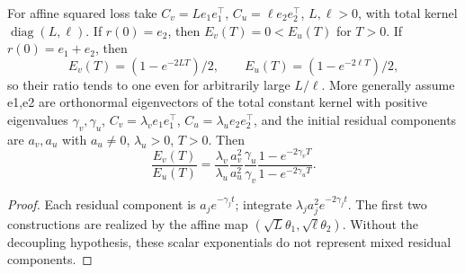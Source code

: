 \begin{proposition}
\label{prop:astra_energy_counter}
For affine squared loss take
$C_v=L e_1e_1^\top$, $C_u=\ell e_2e_2^\top$, $L,\ell>0$, with
total kernel $\operatorname{diag}(L,\ell)$.
If $r(0)=e_2$, then $E_v(T)=0<E_u(T)$ for $T>0$.
If $r(0)=e_1+e_2$, then
\[
 E_v(T)=(1-e^{-2LT})/2,\qquad E_u(T)=(1-e^{-2\ell T})/2,
\]
so their ratio tends to one even for arbitrarily large $L/\ell$.
More generally assume e1,e2 are orthonormal eigenvectors of the total
constant kernel with positive eigenvalues $\gamma_v,\gamma_u$,
$C_v=\lambda_v e_1e_1^\top$, $C_u=\lambda_u e_2e_2^\top$, and the
initial residual components are $a_v,a_u$ with $a_u\ne0$,
$\lambda_u>0$, $T>0$. Then
\begin{equation}\label{eq:astra_decoupled}
 \frac{E_v(T)}{E_u(T)}=
 \frac{\lambda_v}{\lambda_u}\frac{a_v^2}{a_u^2}
 \frac{\gamma_u}{\gamma_v}
 \frac{1-e^{-2\gamma_vT}}{1-e^{-2\gamma_uT}}.
\end{equation}
\end{proposition}
\begin{proof}
Each residual component is $a_je^{-\gamma_jt}$; integrate
$\lambda_ja_j^2e^{-2\gamma_jt}$. The first two constructions are
realized by the affine map $(\sqrt L\theta_1,\sqrt\ell\theta_2)$.
Without the decoupling hypothesis, these scalar exponentials do not
represent mixed residual components.
\end{proof}

